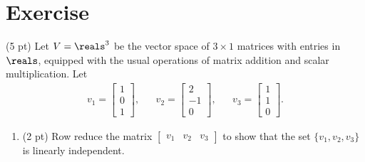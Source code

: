 %
%
\section{Exercise}

(5 pt) Let $V = \reals^{3}$ be the vector space of $3 \times 1$ matrices with entries in $\reals$, equipped with the usual operations of matrix addition and scalar multiplication. Let
\begin{align*}
v_{1}
=
\begin{bmatrix}
1	\\
0	\\
1
\end{bmatrix}%
,
&&
v_{2}
=
\begin{bmatrix}
2	\\
-1	\\
0
\end{bmatrix}%
,
&&
v_{3}
=
\begin{bmatrix}
1	\\
1	\\
0
\end{bmatrix}%
.
\end{align*}
\begin{enumerate}[label=(\alph*)]
\item\label{itm : Quiz 12 Linear Independence} (2 pt) Row reduce the matrix $\begin{bmatrix}v_{1}&v_{2}&v_{3}\end{bmatrix}$ to show that the set $\{v_{1},v_{2},v_{3}\}$ is linearly independent. 
\end{enumerate}

